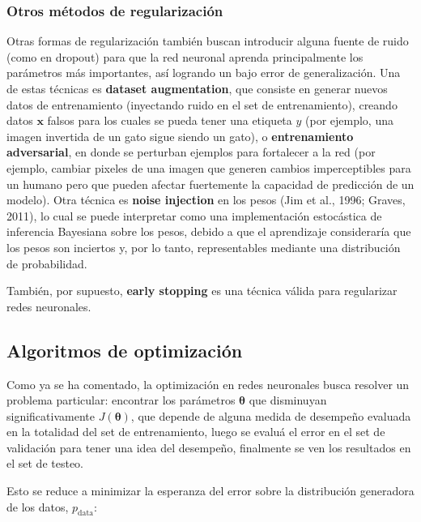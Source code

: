 \subsubsection{Otros m\'etodos de regularizaci\'on}
Otras formas de regularizaci\'on tambi\'en buscan introducir alguna fuente de ruido (como en dropout) para que la red neuronal aprenda principalmente los par\'ametros m\'as importantes, as\'i logrando un bajo error de generalizaci\'on. Una de estas t\'ecnicas es \textbf{dataset augmentation}, que consiste en generar nuevos datos de entrenamiento (inyectando ruido en el set de entrenamiento), creando datos $\bm{x}$ falsos para los cuales se pueda tener una etiqueta $y$ (por ejemplo, una imagen invertida de un gato sigue siendo un gato), o \textbf{entrenamiento adversarial}, en donde se perturban ejemplos para fortalecer a la red (por ejemplo, cambiar pixeles de una imagen que generen cambios imperceptibles para un humano pero que pueden afectar fuertemente la capacidad de predicci\'on de un modelo). Otra t\'ecnica es \textbf{noise injection} en los pesos (Jim et al., 1996; Graves, 2011), lo cual se puede interpretar como una implementaci\'on estoc\'astica de inferencia Bayesiana sobre los pesos, debido a que el aprendizaje considerar\'ia que los pesos son inciertos y, por lo tanto, representables mediante una distribuci\'on de probabilidad.

Tambi\'en, por supuesto, \textbf{early stopping} es una t\'ecnica v\'alida para regularizar redes neuronales.

\subsection{Algoritmos de optimizaci\'on}

Como ya se ha comentado, la optimizaci\'on en redes neuronales busca resolver un problema particular: encontrar los par\'ametros $\bm{\theta}$ que disminuyan significativamente $J(\bm{\theta})$, que depende de alguna medida de desempe{\~{n}}o evaluada en la totalidad del set de entrenamiento, luego se evaluá el error en el set de validaci\'on para tener una idea del desempeño, finalmente se ven los resultados en el set de testeo. 

Esto se reduce a minimizar la esperanza del error sobre la distribuci\'on generadora de los datos, $p_{\textrm{data}}$:


